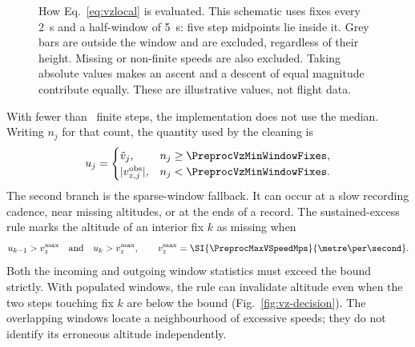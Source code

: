 \begin{revblock}
\begin{figure}[htbp]
  \caption{How Eq.~\eqref{eq:vzlocal} is evaluated. This schematic uses
  fixes every \SI{2}{\second} and a half-window of \SI{5}{\second}:
  five step midpoints lie inside it. Grey bars are outside the window and are
  excluded, regardless of their height. Missing or non-finite speeds are also
  excluded. Taking absolute values makes an ascent and a descent of equal
  magnitude contribute equally. These are illustrative values, not flight data.}
  \label{fig:vz-window}
\end{figure}

With fewer than \PreprocVzMinWindowFixes\ finite steps, the implementation does
not use the median. Writing $n_j$ for that count, the quantity used by the cleaning is
\[
 u_j=\begin{cases}
       \tilde v_j, & n_j\geq\PreprocVzMinWindowFixes,\\
       |v_{z,j}^{\mathrm{obs}}|, & n_j<\PreprocVzMinWindowFixes.
     \end{cases}
\]
The second branch is the sparse-window fallback. It can occur at a slow recording
cadence, near missing altitudes, or at the ends of a record. The sustained-excess
rule marks the altitude of an interior fix $k$ as missing when
\begin{equation}
  u_{k-1}>v_z^{\max}\quad\text{and}\quad u_k>v_z^{\max},
  \qquad v_z^{\max}=\SI{\PreprocMaxVSpeedMps}{\metre\per\second}.
  \label{eq:vz-censor}
\end{equation}
Both the incoming and outgoing window statistics must exceed the bound strictly.
With populated windows, the rule can invalidate altitude even when the two steps
touching fix $k$ are below the bound (Fig.~\ref{fig:vz-decision}). The overlapping
windows locate a neighbourhood of excessive speeds; they do not identify its
erroneous altitude independently.


\end{revblock}
